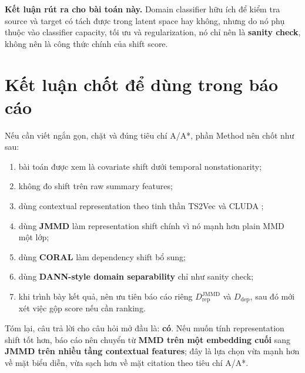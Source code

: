 \documentclass[a4paper]{article}
\begin{document}
	\textbf{Kết luận rút ra cho bài toán này.} Domain classifier hữu ích để kiểm tra source và target có tách được trong latent space hay không, nhưng do nó phụ thuộc vào classifier capacity, tối ưu và regularization, nó chỉ nên là \textbf{sanity check}, không nên là công thức chính của shift score.

\section{Kết luận chốt để dùng trong báo cáo}

Nếu cần viết ngắn gọn, chặt và đúng tiêu chí A/A*, phần Method nên chốt như sau:
\begin{enumerate}[label=\arabic*.]
    \item bài toán được xem là covariate shift dưới temporal nonstationarity;
    \item không đo shift trên raw summary features;
    \item dùng contextual representation theo tinh thần TS2Vec \cite{ts2vec} và CLUDA \cite{cluda};
    \item dùng \textbf{JMMD} \cite{jan} làm representation shift chính vì nó mạnh hơn plain MMD một lớp;
    \item dùng \textbf{CORAL} \cite{coral} làm dependency shift bổ sung;
    \item dùng \textbf{DANN-style domain separability} \cite{dann} chỉ như sanity check;
    \item khi trình bày kết quả, nên ưu tiên báo cáo riêng \(D_{\mathrm{rep}}^{\mathrm{JMMD}}\) và \(D_{\mathrm{dep}}\), sau đó mới xét việc gộp score nếu cần ranking.
\end{enumerate}

Tóm lại, câu trả lời cho câu hỏi mở đầu là: \textbf{có}. Nếu muốn tính representation shift tốt hơn, báo cáo nên chuyển từ \textbf{MMD trên một embedding cuối} sang \textbf{JMMD trên nhiều tầng contextual features}; đây là lựa chọn vừa mạnh hơn về mặt biểu diễn, vừa sạch hơn về mặt citation theo tiêu chí A/A*.
\end{document}
